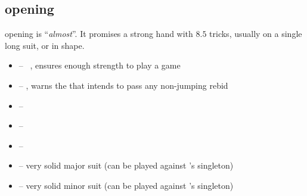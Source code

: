\subsection{\ctr{2\protect\c} opening}
\label{subsec:2c-op}

\ctr{2\c} opening is ``\emph{almost}\gf''. It promises a strong hand with $8.5$ tricks, usually on a single long suit,
or  in \bal\/ shape. \vspace{1em}

\begin{itemize}
  \item \ctr{2\d} -- \art\ \gf, ensures enough strength to play a game
  \item \ctr{2\h} -- \neg, warns the \opn\/ that \resp\/ intends to pass any non-jumping rebid
  \item \ctr{2\s} -- 
  \item \ctr{2\nt} -- 
  \item \ctr{3\minor} -- 
  \item \ctr{3\major} -- very solid major suit (can be played against \opn's singleton)
  \item \ctr{4\minor} -- very solid minor suit (can be played against \opn's singleton)
\end{itemize}
